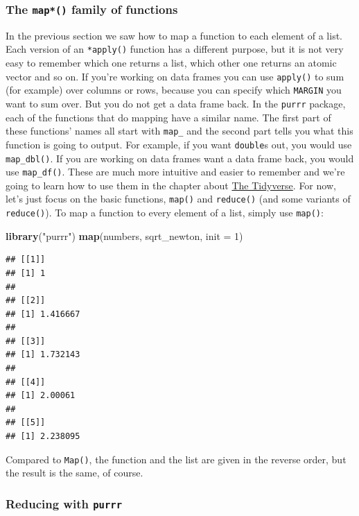 \documentclass[]{gitbook}
\newenvironment{Shaded}{\begin{snugshade}}{\end{snugshade}}
\newcommand{\DataTypeTok}[1]{\textcolor[rgb]{0.13,0.29,0.53}{#1}}
\newcommand{\DecValTok}[1]{\textcolor[rgb]{0.00,0.00,0.81}{#1}}
\newcommand{\KeywordTok}[1]{\textcolor[rgb]{0.13,0.29,0.53}{\textbf{#1}}}
\newcommand{\NormalTok}[1]{#1}
\newcommand{\StringTok}[1]{\textcolor[rgb]{0.31,0.60,0.02}{#1}}
\theoremstyle{definition}
\theoremstyle{definition}
\theoremstyle{definition}
\theoremstyle{remark}
\begin{document}
\hypertarget{the-map-family-of-functions}{%
\subsubsection{\texorpdfstring{The \texttt{map*()} family of
functions}{The map*() family of functions}}\label{the-map-family-of-functions}}

In the previous section we saw how to map a function to each element of
a list. Each version of an \texttt{*apply()} function has a different
purpose, but it is not very easy to remember which one returns a list,
which other one returns an atomic vector and so on. If you're working on
data frames you can use \texttt{apply()} to sum (for example) over
columns or rows, because you can specify which \texttt{MARGIN} you want
to sum over. But you do not get a data frame back. In the \texttt{purrr}
package, each of the functions that do mapping have a similar name. The
first part of these functions' names all start with \texttt{map\_} and
the second part tells you what this function is going to output. For
example, if you want \texttt{double}s out, you would use
\texttt{map\_dbl()}. If you are working on data frames want a data frame
back, you would use \texttt{map\_df()}. These are much more intuitive
and easier to remember and we're going to learn how to use them in the
chapter about \protect\hyperlink{tidyverse}{The Tidyverse}. For now,
let's just focus on the basic functions, \texttt{map()} and
\texttt{reduce()} (and some variants of \texttt{reduce()}). To map a
function to every element of a list, simply use \texttt{map()}:

\begin{Shaded}
\begin{Highlighting}[]
\KeywordTok{library}\NormalTok{(}\StringTok{"purrr"}\NormalTok{)}
\KeywordTok{map}\NormalTok{(numbers, sqrt_newton, }\DataTypeTok{init =} \DecValTok{1}\NormalTok{)}
\end{Highlighting}
\end{Shaded}

\begin{verbatim}
## [[1]]
## [1] 1
## 
## [[2]]
## [1] 1.416667
## 
## [[3]]
## [1] 1.732143
## 
## [[4]]
## [1] 2.00061
## 
## [[5]]
## [1] 2.238095
\end{verbatim}

Compared to \texttt{Map()}, the function and the list are given in the
reverse order, but the result is the same, of course.

\hypertarget{reducing-with-purrr}{%
\subsubsection{\texorpdfstring{Reducing with
\texttt{purrr}}{Reducing with purrr}}\label{reducing-with-purrr}}
\end{document}
